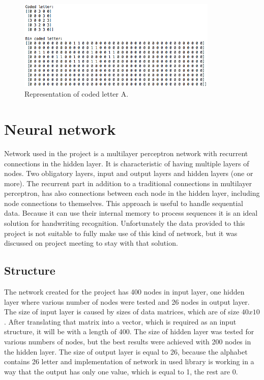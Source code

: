 \documentclass[a4paper, 11pt]{article}
\begin{document}
\begin{figure}[ht]
\begin{center}
\includegraphics[width=0.85\textwidth]{images/coded_letter}
\caption{Representation of coded letter A.}
\label{coded_letter}
\end{center}
\end{figure}


\section{Neural network}

Network used in the project is a multilayer perceptron network with recurrent connections in the hidden layer. It is characteristic of having multiple layers of nodes. Two obligatory layers, input and output layers and hidden layers (one or more). The recurrent part in addition to a traditional connections in multilayer perceptron, has also connections between each node in the hidden layer, including node connections to themselves. This approach is useful to handle sequential data. Because it can use their internal memory to process sequences it is an ideal solution for handwriting recognition. Unfortunately the data provided to this project is not suitable to fully make use of this kind of network, but it was discussed on project meeting to stay with that solution.

\subsection{Structure}

The network created for the project has 400 nodes in input layer, one hidden layer where various number of nodes were tested and 26 nodes in output layer. 
The size of input layer is caused by sizes of data matrices, which are of size \(40x10\). After translating that matrix into a vector, which is required as an input structure, it will be with a length of 400.
The size of hidden layer was tested for various numbers of nodes, but the best results were achieved with 200 nodes in the hidden layer. 
The size of output layer is equal to 26, because the alphabet contains 26 letter and implementation of network in used library is working in a way that the output has only one value, which is equal to 1, the rest are 0.
\end{document}

